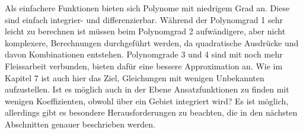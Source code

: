 Als einfachere Funktionen bieten sich Polynome mit niedrigem Grad an. Diese sind einfach integrier- und differenzierbar. Während der Polynomgrad 1 sehr leicht zu berechnen ist müssen beim Polynomgrad 2 aufwändigere, aber nicht komplexere, Berechnungen durchgeführt werden, da quadratische Ausdrücke und davon Kombinationen entstehen. Polynomgrade 3 und 4 sind mit noch mehr Fleissarbeit verbunden, bieten dafür eine bessere Approximation an. Wie im Kapitel 7 ist auch hier das Ziel, Gleichungen mit wenigen Unbekannten aufzustellen. Ist es möglich auch in der Ebene Ansatzfunktionen zu finden mit wenigen Koeffizienten, obwohl über ein Gebiet integriert wird? Es ist möglich, allerdings gibt es besondere Herausforderungen zu beachten, die in den nächsten Abschnitten genauer beschrieben werden.


